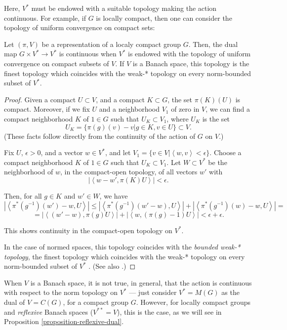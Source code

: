 Here, $V^*$ must be endowed with a suitable topology making the action continuous. For example, if $G$ is locally compact, then one can consider the topology of uniform convergence on compact sets:

\begin{lemma}
\label{lemma-topology-dual}
 Let $(\pi, V)$ be a representation of a localy compact group $G$. Then, the dual map $G\times V^*\to V^*$ is continuous when $V^*$ is endowed with the topology of uniform convergence on compact subsets of $V$. If $V$ is a Banach space, this topology is the finest topology which coincides with the weak-* topology on every norm-bounded subset of $V^*$.
\end{lemma}

\begin{proof}
 Given a compact $U\subset V$, and a compact $K\subset G$, the set $\pi(K)(U)$ is compact. Moreover, 
if we fix $U$ and a neighborhood $V_1$ of zero in $V$, we can find a compact neighborhood $K$ of $1\in G$ such that $U_K\subset V_1$, where $U_K$ is the set
 $$U_K=\{\pi(g)(v)-v| g\in K, v\in U\}\subset V.$$
(These facts follow directly from the continuity of the action of $G$ on $V$.)
 
 Fix $U$, $\epsilon>0$, and a vector $w\in V^*$, and let $V_1 = \{ v\in V| \left< w, v\right> <\epsilon\}$. Choose a compact neighborhood $K$ of $1\in G$ such that $U_K\subset V_1$. Let $W\subset V^*$ be the neighborhood of $w$, in the compact-open topology, of all vectors $w'$ with
 $$ |\left< w-w', \pi(K)U\right>|<\epsilon.$$
 
 Then, for all $g\in K$ and $w'\in W$, we have 
 $$ | \left< \pi^*(g^{-1}) (w')-w, U\right> | \le |\left< \pi^*(g^{-1}) (w'-w), U\right> | + | \left< \pi^*(g^{-1}) (w)-w, U\right> | =$$
 $$ = |\left< (w'-w), \pi(g) U\right> | + | \left< w, (\pi(g) - 1) U\right> | < \epsilon + \epsilon.$$

This shows continuity in the compact-open topology on $V^*$.

In the case of normed spaces, this topology coincides with the \emph{bounded weak-* topology}, the finest topology which coincides with the weak-* topology on every norm-bounded subset of $V^*$ \cite[\S II.5, Lemma 2]{Day}. (See also \cite[\S 2.7 and 3.4]{Megginson}.)
\end{proof}



When $V$ is a Banach space, it is not true, in general, that the action is continuous with respect to the norm topology on $V^*$ --- just consider $V^*=M(G)$ as the dual of $V=C(G)$, for a compact group $G$. However, for locally compact groups and \emph{reflexive} Banach spaces ($V^{**}=V$), this is the case, as we will see in Proposition \ref{proposition-reflexive-dual}.



